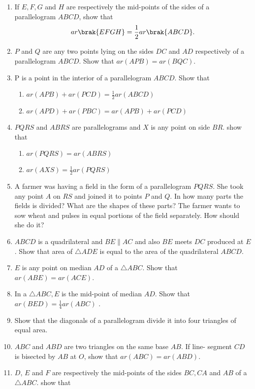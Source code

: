 \begin{enumerate}[label=\arabic*.,ref=\thesubsection.\theenumi]
\item If $E,F,G$ and $H$ are respectively the mid-points of the sides of a parallelogram $ABCD$, show that
\begin{align}
ar \brak{EFGH} =
\frac{1}{ 2}
ar \brak{ABCD} .
\end{align}
%
\item $P$ and $Q$ are any two points lying on the sides $DC$ and $AD$ respectively of a parallelogram $ABCD$. Show that $ar (APB) = ar (BQC)$.
%
\item P is a point in the interior of a parallelogram $ABCD$. Show that
\begin{enumerate}
\item $ar (APB) + ar (PCD) = \frac{1}{ 2}ar (ABCD)$
\item $ar (APD) + ar (PBC) = ar (APB) + ar (PCD)$
\end{enumerate}
%
\item $PQRS$ and $ABRS$ are parallelograms and $X$ is any point on side $BR$. show that 
\begin{enumerate} 
\item $ar (PQRS) = ar (ABRS)$
\item $ar (AX S) = \frac{1}{ 2} ar (PQRS)$
\end{enumerate}
%
\item A farmer was having a field in the form of a parallelogram $PQRS$. She took any point $A$ on $RS$ and joined it to points $P$ and $Q$. In how many parts the fields is divided? What are the shapes of these parts? The farmer wants to sow wheat and pulses in equal portions of the field separately. How should she do it?
%
\item $ABCD$ is a quadrilateral and $BE  \parallel  AC$ and also $BE$ meets $DC$ produced at $E$. Show that area of $ \triangle  ADE$ is equal to the area of the quadrilateral $ABCD$.
%
\item $E$ is any point on median $AD$ of a  $\triangle  ABC$. Show that $ar (ABE) = ar (ACE)$.
\item  In a $\triangle ABC, E$ is the mid-point of median $AD$. Show that $ar (BED) = \frac{1}{ 4}ar(ABC)$ .
\item  Show that the diagonals of a parallelogram divide it into four triangles of equal area.
\item   $ABC$ and $ABD$ are two triangles on the same base $AB$. If line- segment $CD$ is bisected by $AB$ at $O$, show that $ar(ABC) = ar (ABD)$.
%
\item $D$, $E$ and $F$ are respectively the mid-points of the sides $BC, CA$ and $AB$ of a $ \triangle  ABC$. show that 

\end{enumerate}
